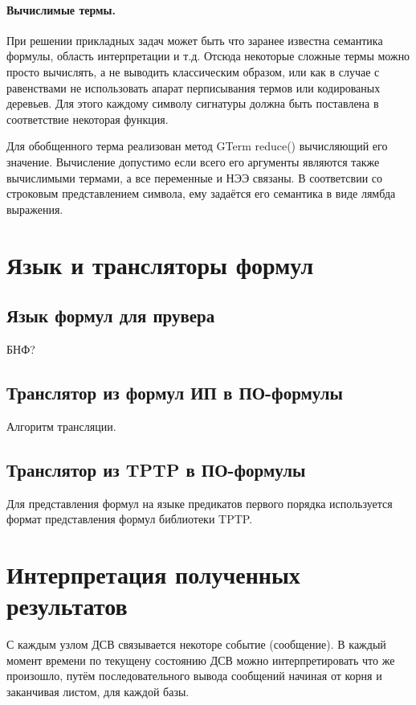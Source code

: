 \paragraph{Вычислимые термы.} При решении прикладных задач может быть что заранее известна семантика формулы, область интерпретации и т.д. Отсюда некоторые сложные термы можно просто вычислять, а не выводить классическим образом, или как в случае с равенствами не использовать апарат перписывания термов или кодированых деревьев. Для этого каждому символу сигнатуры должна быть поставлена в соответствие некоторая функция.

Для обобщенного терма реализован метод GTerm reduce() вычисляющий его значение. Вычисление допустимо если всего его аргументы являются также вычислимыми термами, а все переменные и НЭЭ связаны. В соответсвии со строковым представлением символа, ему задаётся его семантика в виде лямбда выражения.


\section{Язык и трансляторы формул}

\subsection{Язык формул для прувера}
БНФ?

\subsection{Транслятор из формул ИП в ПО-формулы}
Алгоритм трансляции.

\subsection{Транслятор из TPTP в ПО-формулы}
Для представления формул на языке предикатов первого порядка используется формат представления формул библиотеки TPTP.

\section{Интерпретация полученных результатов}
С каждым узлом ДСВ связывается некоторе событие (сообщение). В каждый момент времени по текущену состоянию ДСВ можно интерпретировать что же произошло, путём последовательного вывода сообщений начиная от корня и заканчивая листом, для каждой базы.


